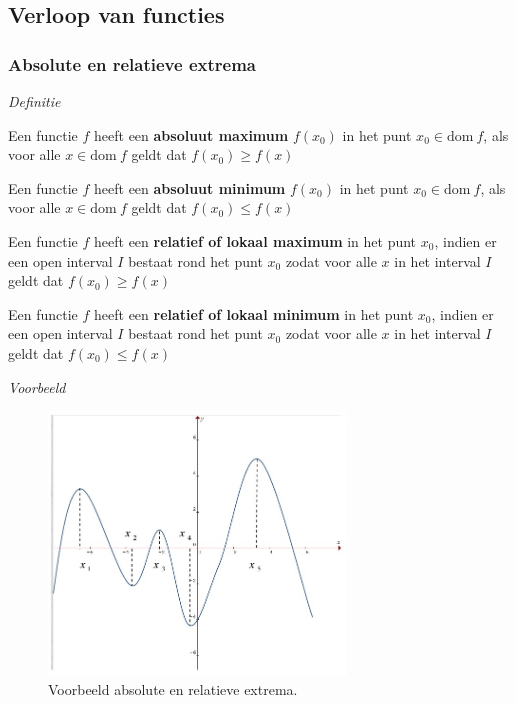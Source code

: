 \subsection{Verloop van functies}

\subsubsection{Absolute en relatieve extrema}

\emph{Definitie}

\noindent Een functie $f$ heeft een \textbf{absoluut maximum} $f(x_{0})$
in het punt $x_{0}\in\textrm{dom}\:f$, als voor alle $x\in\textrm{dom}\:f$
geldt dat $f(x_{0})\geqslant f(x)$

\noindent Een functie $f$ heeft een \textbf{absoluut minimum} $f(x_{0})$
in het punt $x_{0}\in\textrm{dom}\:f$, als voor alle $x\in\textrm{dom}\:f$
geldt dat $f(x_{0})\leqslant f(x)$

\noindent Een functie $f$ heeft een \textbf{relatief of lokaal maximum}
in het punt $x_{0}$, indien er een open interval $I$ bestaat rond
het punt $x_{0}$ zodat voor alle $x$ in het interval $I$ geldt
dat $f(x_{0})\geqslant f(x)$

\noindent Een functie $f$ heeft een \textbf{relatief of lokaal minimum}
in het punt $x_{0}$, indien er een open interval $I$ bestaat rond
het punt $x_{0}$ zodat voor alle $x$ in het interval $I$ geldt
dat $f(x_{0})\leqslant f(x)$

\medskip{}


\emph{Voorbeeld}

\begin{figure}[h]
\centering{}\includegraphics[height=7cm]{2_elem_rekenvaardigheden_B/inputs/verloop_vb1.jpg} 
\caption{Voorbeeld absolute en relatieve extrema.}
\label{fig:vb1}
\end{figure}


